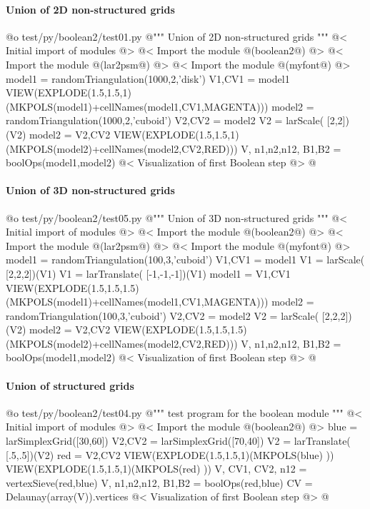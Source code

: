 \documentclass[11pt,oneside]{article}	%
\begin{document}
\paragraph{Union of 2D non-structured grids}

@o test/py/boolean2/test01.py
@{""" Union of 2D non-structured grids """
@< Initial import of modules @>
@< Import the module @(boolean2@) @>
@< Import the module @(lar2psm@) @>
@< Import the module @(myfont@) @>
model1 = randomTriangulation(1000,2,'disk')
V1,CV1 = model1
VIEW(EXPLODE(1.5,1.5,1)(MKPOLS(model1)+cellNames(model1,CV1,MAGENTA)))
model2 = randomTriangulation(1000,2,'cuboid')
V2,CV2 = model2
V2 = larScale( [2,2])(V2)
model2 = V2,CV2 
VIEW(EXPLODE(1.5,1.5,1)(MKPOLS(model2)+cellNames(model2,CV2,RED)))
V, n1,n2,n12, B1,B2 = boolOps(model1,model2)
@< Visualization of first Boolean step @>
@}

\paragraph{Union of 3D non-structured grids}

@o test/py/boolean2/test05.py
@{""" Union of 3D non-structured grids """
@< Initial import of modules @>
@< Import the module @(boolean2@) @>
@< Import the module @(lar2psm@) @>
@< Import the module @(myfont@) @>
model1 = randomTriangulation(100,3,'cuboid')
V1,CV1 = model1
V1 = larScale( [2,2,2])(V1)
V1 = larTranslate( [-1,-1,-1])(V1)
model1 = V1,CV1 
VIEW(EXPLODE(1.5,1.5,1.5)(MKPOLS(model1)+cellNames(model1,CV1,MAGENTA)))
model2 = randomTriangulation(100,3,'cuboid')
V2,CV2 = model2
V2 = larScale( [2,2,2])(V2)
model2 = V2,CV2 
VIEW(EXPLODE(1.5,1.5,1.5)(MKPOLS(model2)+cellNames(model2,CV2,RED)))
V, n1,n2,n12, B1,B2 = boolOps(model1,model2)
@< Visualization of first Boolean step @>
@}


\paragraph{Union of structured grids}

@o test/py/boolean2/test04.py
@{""" test program for the boolean module """
@< Initial import of modules @>
@< Import the module @(boolean2@) @>
blue = larSimplexGrid([30,60])
V2,CV2 = larSimplexGrid([70,40])
V2 = larTranslate( [.5,.5])(V2)
red = V2,CV2
VIEW(EXPLODE(1.5,1.5,1)(MKPOLS(blue) ))
VIEW(EXPLODE(1.5,1.5,1)(MKPOLS(red) ))
V, CV1, CV2, n12 = vertexSieve(red,blue)
V, n1,n2,n12, B1,B2 = boolOps(red,blue)
CV = Delaunay(array(V)).vertices
@< Visualization of first Boolean step @>
@}
\end{document}

